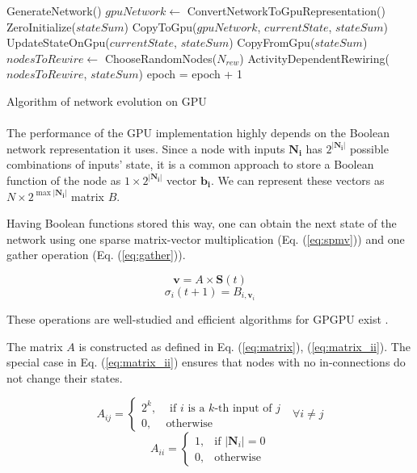 \documentclass[procedia]{easychair}
\begin{document}
	\begin{algorithm}[ht!]
		\label{algo:gpu}
		GenerateNetwork()\;
		{
			$gpuNetwork \leftarrow$ ConvertNetworkToGpuRepresentation()\;
			ZeroInitialize($stateSum$)\;
			CopyToGpu($gpuNetwork$, $currentState$, $stateSum$)\;
			{ 	
				UpdateStateOnGpu($currentState$, $stateSum$)\;
			}
			CopyFromGpu($stateSum$)\;
			$nodesToRewire \leftarrow$ ChooseRandomNodes($N_{rew}$)\;
			ActivityDependentRewiring($nodesToRewire$, $stateSum$)\;
			epoch = epoch + 1\;
		}
		\caption{Algorithm of network evolution on GPU}
	\end{algorithm}

	\paragraph{} The performance of the GPU implementation highly depends on the Boolean network representation it uses. Since a node with inputs \(\mathbf{N_i}\) has \(2^{|\mathbf{N_i}|}\) possible combinations of inputs' state, it is a common approach to store a Boolean function of the node as \(1 \times 2^{|\mathbf{N_i}|}\) vector \(\mathbf{b_i}\). We can represent these vectors as \(N \times 2^{\max{|\mathbf{N_i}|}}\) matrix \(B\).
	
	Having Boolean functions stored this way, one can obtain the next state of the network using one sparse matrix-vector multiplication (Eq. (\ref{eq:spmv})) and one gather operation (Eq. (\ref{eq:gather})).
	
	\begin{equation}
	\label{eq:spmv}
		\mathbf{v} = A \times \mathbf{S}(t)
	\end{equation}
	\begin{equation}
	\label{eq:gather}
		\sigma_i(t+1) = B_{i, \mathbf{v}_i}
	\end{equation}
	
	These operations are well-studied and efficient algorithms for GPGPU exist \cite{bell2008efficient}\cite{he2007efficient}.
	
	The matrix \(A\) is constructed as defined in Eq. (\ref{eq:matrix}), (\ref{eq:matrix_ii}). The special case in Eq. (\ref{eq:matrix_ii}) ensures that nodes with no in-connections do not change their states.
	
	\begin{equation}
		\label{eq:matrix}
		A_{ij} = \begin{cases}
			2^k, & \mbox{ if } i\mbox{ is a } k \mbox{-th input of } j \\
			0, & \mbox{otherwise}
		\end{cases} \mbox{  } \forall i \neq j
	\end{equation}
	\begin{equation}
	\label{eq:matrix_ii}
	A_{ii} = \begin{cases}
		1, & \mbox{if } |\mathbf{N}_i|=0\\
		0, & \mbox{otherwise}
		\end{cases}
	\end{equation}
	
\end{document}
